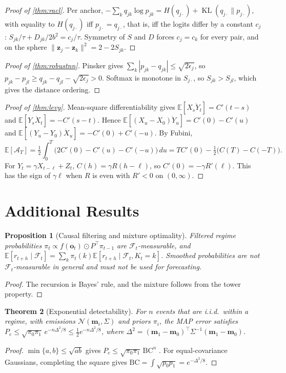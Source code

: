 \documentclass{article}
\theoremstyle{plain}
\newtheorem{theorem}{Theorem}[section]
\newtheorem{proposition}[theorem]{Proposition}
\theoremstyle{definition}
\theoremstyle{remark}
\newcommand{\E}{\mathbb{E}}
\newcommand{\N}{\mathcal{N}}
\newcommand{\F}{\mathcal{F}}
\newcommand{\z}{\bm{z}}
\DeclareMathOperator{\KL}{KL}
\begin{document}
\begin{proof}[Proof of \cref{thm:racl}]
Per anchor, $-\sum_kq_{jk}\log p_{jk}=H(q_{j\cdot})+\KL(q_{j\cdot}\|p_{j\cdot})$, with equality to $H(q_{j\cdot})$ iff $p_{j\cdot}=q_{j\cdot}$, that is, iff the logits differ by a constant $c_j$: $S_{jk}/\tau+D_{jk}/2b^2=c_j/\tau$. Symmetry of $S$ and $D$ forces $c_j=c_k$ for every pair, and on the sphere $\|\z_j-\z_k\|^2=2-2S_{jk}$.
\end{proof}

\begin{proof}[Proof of \cref{thm:robustnn}]
Pinsker gives $\sum_k|p_{jk}-q_{jk}|\le\sqrt{2\epsilon_j}$, so $p_{jk}-p_{jl}\ge q_{jk}-q_{jl}-\sqrt{2\epsilon_j}>0$. Softmax is monotone in $S_{j\cdot}$, so $S_{jk}>S_{jl}$, which gives the distance ordering.
\end{proof}

\begin{proof}[Proof of \cref{thm:levy}]
Mean-square differentiability gives $\E[X_s\dot Y_t]=C'(t-s)$ and $\E[Y_s\dot X_t]=-C'(s-t)$. Hence $\E[(X_u-X_0)\dot Y_u]=C'(0)-C'(u)$ and $\E[(Y_u-Y_0)\dot X_u]=-C'(0)+C'(-u)$. By Fubini,
\[
  \E[\mathcal{A}_T]=\tfrac12\int_0^T\big(2C'(0)-C'(u)-C'(-u)\big)\,du=TC'(0)-\tfrac12\big(C(T)-C(-T)\big).
\]
For $Y_t=\gamma X_{t-\ell}+Z_t$, $C(h)=\gamma R(h-\ell)$, so $C'(0)=-\gamma R'(\ell)$. This has the sign of $\gamma\ell$ when $R$ is even with $R'<0$ on $(0,\infty)$.
\end{proof}

\section{Additional Results}\label{app:extra}

\begin{proposition}[Causal filtering and mixture optimality]\label{prop:filter}
Filtered regime probabilities $\pi_t\propto f(\bm o_t)\odot P^\top\pi_{t-1}$ are $\F_t$-measurable, and $\E[r_{t+h}\mid\F_t]=\sum_k\pi_t(k)\E[r_{t+h}\mid\F_t,K_t=k]$. Smoothed probabilities are not $\F_t$-measurable in general and must not be used for forecasting.
\end{proposition}
\begin{proof}
The recursion is Bayes' rule, and the mixture follows from the tower property.
\end{proof}

\begin{theorem}[Exponential detectability]\label{thm:detect}
For $n$ events that are i.i.d.\ within a regime, with emissions $\N(\bm m_i,\Sigma)$ and priors $\pi_i$, the MAP error satisfies $P_e\le\sqrt{\pi_0\pi_1}\,e^{-n\Delta^2/8}\le\tfrac12e^{-n\Delta^2/8}$, where $\Delta^2=(\bm m_1-\bm m_0)^\top\Sigma^{-1}(\bm m_1-\bm m_0)$.
\end{theorem}
\begin{proof}
$\min\{a,b\}\le\sqrt{ab}$ gives $P_e\le\sqrt{\pi_0\pi_1}\,\mathrm{BC}^n$ \citep{bhattacharyya1943,kailath1967}. For equal-covariance Gaussians, completing the square gives $\mathrm{BC}=\int\sqrt{p_0p_1}=e^{-\Delta^2/8}$.
\end{proof}
\end{document}
